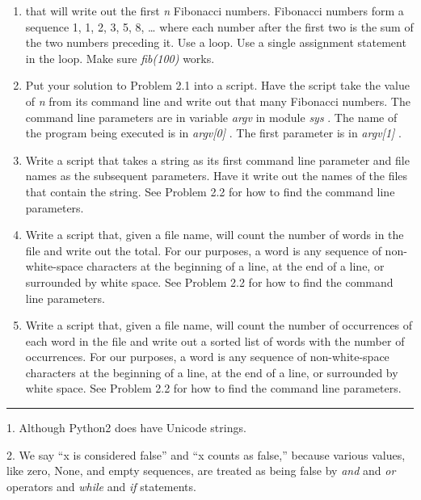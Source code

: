 \begin{enumerate}
\tightlist
\item
  
  that will write out the first \emph{n} Fibonacci numbers. Fibonacci
  numbers form a sequence 1, 1, 2, 3, 5, 8, \ldots{} where each number
  after the first two is the sum of the two numbers preceding it. Use a
  loop. Use a single assignment statement in the loop. Make sure
  \emph{fib(100)} works.
\item
  Put your solution to Problem 2.1
  into a script. Have the script take the value of \emph{n} from its
  command line and write out that many Fibonacci numbers. The command
  line parameters are in variable \emph{argv} in module \emph{sys} . The
  name of the program being executed is in \emph{argv{[}0{]}} . The
  first parameter is in \emph{argv{[}1{]}} .
\item
  Write a script that takes a
  string as its first command line parameter and file names as the
  subsequent parameters. Have it write out the names of the files that
  contain the string. See Problem 2.2 for how to find the command line
  parameters.
\item
  Write a script that, given a
  file name, will count the number of words in the file and write out
  the total. For our purposes, a word is any sequence of non-white-space
  characters at the beginning of a line, at the end of a line, or
  surrounded by white space. See Problem 2.2 for how to find the command
  line parameters.
\item
  Write a script that, given a
  file name, will count the number of occurrences of each word in the
  file and write out a sorted list of words with the number of
  occurrences. For our purposes, a word is any sequence of
  non-white-space characters at the beginning of a line, at the end of a
  line, or surrounded by white space. See Problem 2.2 for how to find
  the command line parameters.
\end{enumerate}

\begin{center}\rule{0.5\linewidth}{\linethickness}\end{center}

{ 1.} Although Python2 does have
Unicode strings.

{ 2.} We say ``x is considered
false'' and ``x counts as false,'' because various values, like zero,
None, and empty sequences, are treated as being false by \emph{and} and
\emph{or} operators and \emph{while} and \emph{if} statements.

